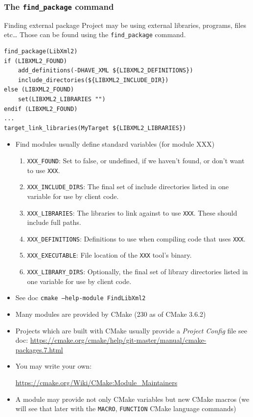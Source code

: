 \documentclass[compress,slidestop,table
              ]
               {beamer}
\newcommand{\fname}[1]{\texttt{#1}}
\begin{document}
\begin{frame}
\frametitle{The \lstinline!find_package! command}
\begin{block}{Finding external package}
Project may be using external libraries, programs, files etc\ldots
Those can be found using the \lstinline!find_package! command.
\end{block}
\begin{lstlisting}[basicstyle=\scriptsize,caption=using libxml2]
find_package(LibXml2)
if (LIBXML2_FOUND)
    add_definitions(-DHAVE_XML ${LIBXML2_DEFINITIONS})
    include_directories(${LIBXML2_INCLUDE_DIR})
else (LIBXML2_FOUND)
    set(LIBXML2_LIBRARIES "")
endif (LIBXML2_FOUND)
...
target_link_libraries(MyTarget ${LIBXML2_LIBRARIES})
\end{lstlisting}
\begin{itemize}
\item Find modules usually define standard variables (for module XXX)
     \begin{enumerate}
     \item \fname{XXX\_FOUND}: Set to false, or undefined, if we haven't found, or don't want to use \fname{XXX}.
     \item \fname{XXX\_INCLUDE\_DIRS}: The final set of include directories listed in one variable for use by client code.
     \item \fname{XXX\_LIBRARIES}: The libraries to link against to use \fname{XXX}.
           These should include full paths.
     \item \fname{XXX\_DEFINITIONS}: Definitions to use when compiling code that uses \fname{XXX}.
     \item \fname{XXX\_EXECUTABLE}: File location of the \fname{XXX} tool's binary.
     \item \fname{XXX\_LIBRARY\_DIRS}: Optionally, the final set of library directories listed in one variable for use by client code.
     \end{enumerate}
\item See doc \fname{cmake --help-module FindLibXml2}
\item Many modules are provided by CMake (230 as of CMake 3.6.2)
\item Projects which are built with CMake usually provide a \emph{Project Config} file
      see doc: \url{https://cmake.org/cmake/help/git-master/manual/cmake-packages.7.html}
\item You may write your own:

      \url{https://cmake.org/Wiki/CMake:Module_Maintainers}
\item A module may provide not only CMake variables but new CMake macros
      (we will see that later with the \lstinline!MACRO!, \lstinline!FUNCTION!
       CMake language commands)
\end{itemize}
\end{frame}
\end{document}
